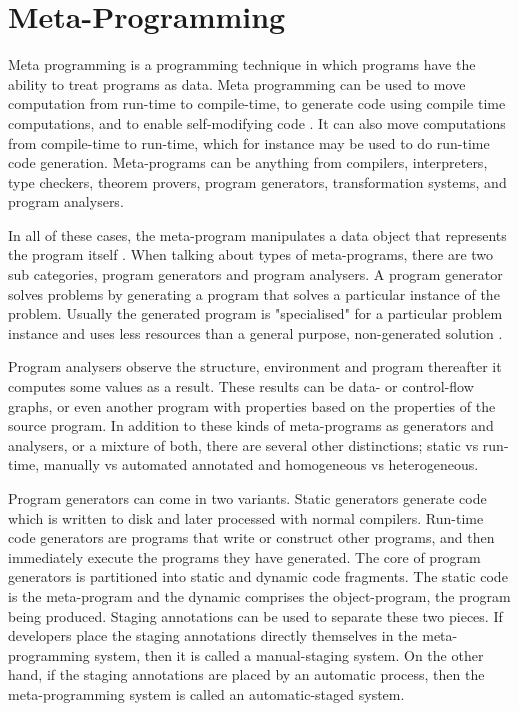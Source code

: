 \section{Meta-Programming}
Meta programming is a programming technique in which programs have the ability to treat programs as data. Meta programming can be used to move computation from run-time to compile-time, to generate code using compile time computations, and to enable self-modifying code \cite{chlipala2010ur} \cite{czarnecki2000generative}. It can also move computations from compile-time to run-time, which for instance may be used to do run-time code generation. Meta-programs can be anything from compilers, interpreters, type checkers, theorem provers, program generators, transformation systems, and program analysers.

In all of these cases, the meta-program manipulates a data object that represents the program itself \cite{sheard2001accomplishments}. When talking about types of meta-programs, there are two sub categories, program generators and program analysers\cite{pasalic2004role}. A program generator solves problems by generating a program that solves a particular instance of the problem. Usually the generated program is "specialised" for a particular problem instance and uses less resources than a general purpose, non-generated solution \cite{sheard2001accomplishments}.

Program analysers observe the structure, environment and program thereafter it computes some values as a result.  These results can be data- or control-flow graphs, or even another program with properties based on the properties of the source program\cite{sheard2001accomplishments}. In addition to these kinds of meta-programs as generators and analysers, or a mixture of both, there are several other distinctions; static vs run-time, manually vs automated annotated and homogeneous vs heterogeneous.

Program generators can come in two variants. Static generators generate code which is written to disk and later processed with normal compilers\cite{czarnecki2002generative}. Run-time code generators are programs that write or construct other programs, and then immediately execute the programs they have generated. The core of program generators is partitioned into static and dynamic code fragments\cite{sztipanovits2002generative}. The static code is the meta-program and the dynamic comprises the object-program, the program being produced. Staging annotations can be used to separate these two pieces\cite{sztipanovits2002generative}. If developers place the staging annotations directly themselves in the meta-programming system, then it is called a manual-staging system. On the other hand, if the staging annotations are placed by an automatic process, then the meta-programming system is called an automatic-staged system\cite{sztipanovits2002generative}.

